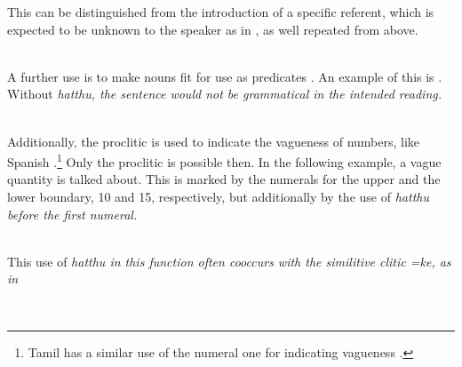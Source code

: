 This can be distinguished from the introduction of a specific referent, which is expected to be unknown to the speaker as in , as well repeated from above.

\\ 

A further use is to make nouns fit for use as predicates .
An example of this is . Without \em hatthu, \em the sentence would not be grammatical in the intended reading.

\\  

Additionally, the proclitic is used to indicate the vagueness of numbers, like Spanish .\footnote{Tamil has a similar use of the numeral one for indicating vagueness \citep[135]{Schiffman1999}.} Only the proclitic is possible then. In the following example, a vague quantity is talked about. This is marked by the numerals for the upper and the lower boundary, 10 and 15, respectively, but additionally by the use of \em hatthu \em before the first numeral.
 
\\ 

This use of \em hatthu \em in this function often cooccurs with the similitive clitic \em =ke\em, as in 
 
\\ 

